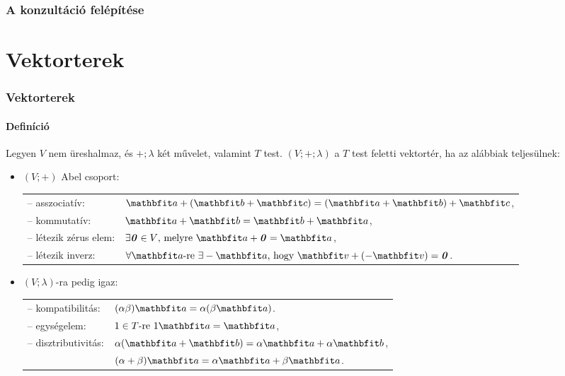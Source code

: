 \documentclass[xcolor={table}]{beamer}
\institute{Mechatronika szakosztály}
\begin{document}
\frame{\titlepage}

\begin{frame}
  \frametitle{A konzultáció felépítése}
  \tableofcontents
\end{frame}

\section{Vektorterek}
\begin{frame}
  \frametitle{Vektorterek}
  \framesubtitle{Definíció}

  Legyen $V$ nem üreshalmaz, és $+; \lambda$ két művelet, valamint $T$ test.
  $(V; +; \lambda)$ a $T$ test feletti vektortér, ha az alábbiak teljesülnek:
  \begin{itemize}
    \def\arraystretch{1.2}
    \item $(V; +)$ Abel csoport:\\[1mm]
          \begin{tabular}{p{35mm} l}
            -- asszociatív:        &
            $\rvec a + (\rvec b + \rvec c) = (\rvec a + \rvec b) + \rvec c$,
            \\
            -- kommutatív:         &
            $\rvec a + \rvec b = \rvec b + \rvec a$,
            \\
            -- létezik zérus elem: &
            $\exists \nvec \in V \text{, melyre } \rvec a + \nvec = \rvec a$,
            \\
            -- létezik inverz:     &
            $\forall \rvec a \text{-re } \exists - \rvec a \text{, hogy } \rvec v + (- \rvec v) = \nvec$.
          \end{tabular}
    \item $(V; \lambda)$-ra pedig igaz:\\[1mm]
          \begin{tabular}{p{35mm} l}
            -- kompatibilitás:   & $(\alpha \beta) \rvec a = \alpha (\beta \rvec a)$.
            \\
            -- egységelem:       & $1 \in T \text{-re } 1\rvec a = \rvec a$,
            \\
            -- disztributivitás: & $\alpha(\rvec a + \rvec b) = \alpha \rvec a + \alpha \rvec b$,
            \\
                                 & $(\alpha + \beta) \rvec a = \alpha \rvec a + \beta \rvec a$.
          \end{tabular}
  \end{itemize}
\end{frame}
\end{document}
